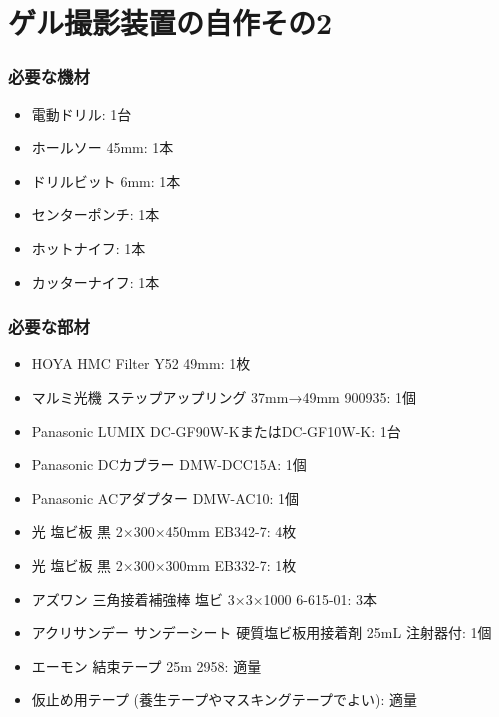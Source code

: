 \documentclass[titlepage,10pt,a4paper,uplatex]{jsbook}
\begin{document}
\section{ゲル撮影装置の自作その2}\label{makinggelimager2}

\subsubsection{必要な機材}
\begin{itemize}
\item 電動ドリル: 1台
\item ホールソー 45mm: 1本
\item ドリルビット 6mm: 1本
\item センターポンチ: 1本
\item ホットナイフ: 1本
\item カッターナイフ: 1本
\end{itemize}

\subsubsection{必要な部材}
\begin{itemize}
\item HOYA HMC Filter Y52 49mm: 1枚
\item マルミ光機 ステップアップリング 37mm→49mm 900935: 1個
\item Panasonic LUMIX DC-GF90W-KまたはDC-GF10W-K: 1台
\item Panasonic DCカプラー DMW-DCC15A: 1個
\item Panasonic ACアダプター DMW-AC10: 1個
\item 光 塩ビ板 黒 2×300×450mm EB342-7: 4枚
\item 光 塩ビ板 黒 2×300×300mm EB332-7: 1枚
\item アズワン 三角接着補強棒 塩ビ 3×3×1000 6-615-01: 3本
\item アクリサンデー サンデーシート 硬質塩ビ板用接着剤 25mL 注射器付: 1個
\item エーモン 結束テープ 25m 2958: 適量
\item 仮止め用テープ (養生テープやマスキングテープでよい): 適量
\end{itemize}
\end{document}
